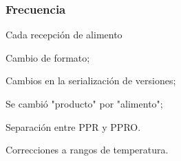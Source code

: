 \subsubsection{Frecuencia}

Cada recepción de \gls{alimento}

\begin{changelog}[title=Registro de cambios,simple, sectioncmd=\subsection*]
	\begin{version}[v=2.0, date=2023--01, author=Pablo E. Alanis]
			\item Cambio de formato;
			\item Cambios en la serialización de versiones;
			\item Se cambió "producto" por "alimento";
			\item Separación entre PPR y PPRO.
		\end{version}

	\begin{version}[v=2.1, date=2023--07, author=Pablo E. Alanis]
		\item Correcciones a rangos de temperatura.
	\end{version}
\end{changelog}
